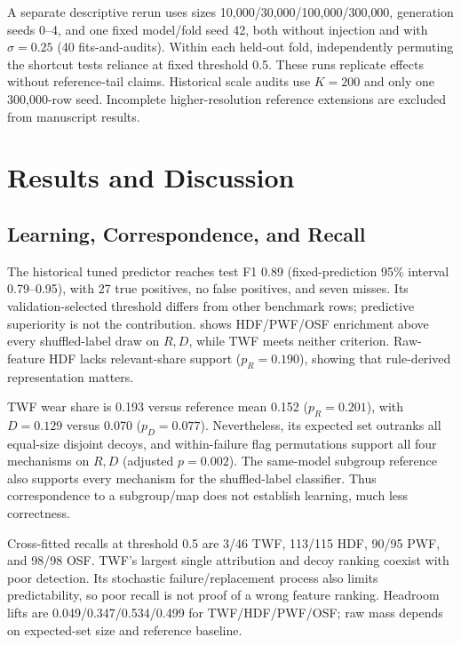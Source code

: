 \documentclass[conference]{IEEEtran}
\begin{document}
A separate descriptive rerun uses sizes 10{,}000/30{,}000/100{,}000/300{,}000, generation seeds 0--4, and one fixed model/fold seed 42, both without injection and with $\sigma=0.25$ (40 fits-and-audits). Within each held-out fold, independently permuting the shortcut tests reliance at fixed threshold 0.5. These runs replicate effects without reference-tail claims. Historical scale audits use $K=200$ and only one 300{,}000-row seed. Incomplete higher-resolution reference extensions are excluded from manuscript results.

\section{Results and Discussion}
\label{sec:results}
\subsection{Learning, Correspondence, and Recall}
The historical tuned predictor reaches test F1 0.89 (fixed-prediction 95\% interval 0.79--0.95), with 27 true positives, no false positives, and seven misses. Its validation-selected threshold differs from other benchmark rows; predictive superiority is not the contribution.  shows HDF/PWF/OSF enrichment above every shuffled-label draw on $R,D$, while TWF meets neither criterion. Raw-feature HDF lacks relevant-share support ($p_R=0.190$), showing that rule-derived representation matters.

\begin{table}[t]
\centering
\caption{Historical primary audit: five-fold held-out XGBoost explanations, seed 42, $K=1{,}000$. Ref.: shuffled-label means. Holm adjustment is separate for each statistic across four mechanisms. A cross marks unsupported $R$ or $D$. RNF has no mechanism-correctness test.}
\label{tab:audit}
\footnotesize

\end{table}

TWF wear share is 0.193 versus reference mean 0.152 ($p_R=0.201$), with $D=0.129$ versus 0.070 ($p_D=0.077$). Nevertheless, its expected set outranks all equal-size disjoint decoys, and within-failure flag permutations support all four mechanisms on $R,D$ (adjusted $p=0.002$). The same-model subgroup reference also supports every mechanism for the shuffled-label classifier. Thus correspondence to a subgroup/map does not establish learning, much less correctness.

Cross-fitted recalls at threshold 0.5 are 3/46 TWF, 113/115 HDF, 90/95 PWF, and 98/98 OSF. TWF's largest single attribution and decoy ranking coexist with poor detection. Its stochastic failure/replacement process also limits predictability, so poor recall is not proof of a wrong feature ranking. Headroom lifts are 0.049/0.347/0.534/0.499 for TWF/HDF/PWF/OSF; raw mass depends on expected-set size and reference baseline.
\end{document}
